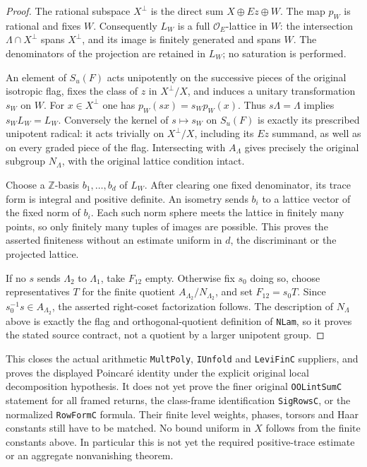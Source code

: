 \begin{proof}
The rational subspace $X^\perp$ is the direct sum
$X\oplus Ez\oplus W$.  The map $p_W$ is rational and fixes $W$.
Consequently $L_W$ is a full $\mathcal O_E$-lattice in $W$:
the intersection $\Lambda\cap X^\perp$ spans $X^\perp$, and its
image is finitely generated and spans $W$.  The denominators of
the projection are retained in $L_W$; no saturation is performed.

An element of $S_u(F)$ acts unipotently on the successive pieces
of the original isotropic flag, fixes the class of $z$ in
$X^\perp/X$, and induces a unitary transformation $s_W$ on $W$.
For $x\in X^\perp$ one has $p_W(sx)=s_Wp_W(x)$.  Thus
$s\Lambda=\Lambda$ implies $s_WL_W=L_W$.  Conversely the kernel
of $s\mapsto s_W$ on $S_u(F)$ is exactly its prescribed unipotent
radical: it acts trivially on $X^\perp/X$, including its $Ez$
summand, as well as on every graded piece of the flag.  Intersecting
with $A_\Lambda$ gives precisely the original subgroup
$N_\Lambda$, with the original lattice condition intact.

Choose a $\mathbb Z$-basis $b_1,\ldots,b_d$ of $L_W$.  After
clearing one fixed denominator, its trace form is integral and
positive definite.  An isometry sends $b_i$ to a lattice vector
of the fixed norm of $b_i$.  Each such norm sphere meets the lattice
in finitely many points, so only finitely many tuples of images
are possible.  This proves the asserted finiteness without an
estimate uniform in $d$, the discriminant or the projected lattice.

If no $s$ sends $\Lambda_2$ to $\Lambda_1$, take $F_{12}$ empty.
Otherwise fix $s_0$ doing so, choose representatives $T$ for the
finite quotient $A_{\Lambda_2}/N_{\Lambda_2}$, and set
$F_{12}=s_0T$.  Since $s_0^{-1}s\in A_{\Lambda_2}$,
the asserted right-coset factorization follows.  The description
of $N_\Lambda$ above is exactly the flag and orthogonal-quotient
definition of \texttt{NLam}, so it proves the stated source
contract, not a quotient by a larger unipotent group.
\end{proof}

This closes the actual arithmetic \texttt{MultPoly},
\texttt{IUnfold} and \texttt{LeviFinC} suppliers, and proves the
displayed Poincar\'e identity under the explicit original local
decomposition hypothesis.
It does not yet prove the finer original \texttt{OOLintSumC}
statement for all framed returns, the class-frame identification
\texttt{SigRowsC}, or the normalized \texttt{RowFormC} formula.
Their finite level weights, phases, torsors and Haar constants still
have to be matched.  No bound uniform in $X$ follows from the
finite constants above.  In particular this is not yet the required
positive-trace estimate or an aggregate nonvanishing theorem.
